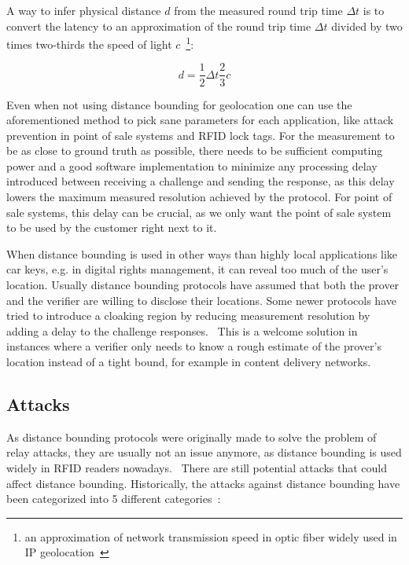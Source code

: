 A way to infer physical distance \(d\) from the measured round trip time \(\Delta t\) is to convert the latency to an approximation of the round trip time \(\Delta t\) divided by two times two-thirds the speed of light \(c\)~\footnote{an approximation of network transmission speed in optic fiber widely used in IP geolocation~\cite{Candela2020-am}}:

\begin{equation*}
  d = \frac{1}{2}\Delta t \frac{2}{3}c
\end{equation*}

Even when not using distance bounding for geolocation one can use the aforementioned method to pick sane parameters for each application, like attack prevention in point of sale systems and RFID lock tags. For the measurement to be as close to ground truth as possible, there needs to be sufficient computing power and a good software implementation to minimize any processing delay introduced between receiving a challenge and sending the response, as this delay lowers the maximum measured resolution achieved by the protocol. For point of sale systems, this delay can be crucial, as we only want the point of sale system to be used by the customer right next to it.

When distance bounding is used in other ways than highly local applications like car keys, e.g. in digital rights management, it can reveal too much of the user's location. Usually distance bounding protocols have assumed that both the prover and the verifier are willing to disclose their locations. Some newer protocols have tried to introduce a cloaking region by reducing measurement resolution by adding a delay to the challenge responses.~\cite{Molina-Martinez2018-nw} This is a welcome solution in instances where a verifier only needs to know a rough estimate of the prover's location instead of a tight bound, for example in content delivery networks.

\subsection{Attacks}
As distance bounding protocols were originally made to solve the problem of relay attacks, they are usually not an issue anymore, as distance bounding is used widely in RFID readers nowadays.~\cite{Nikov_undated-vv} There are still potential attacks that could affect distance bounding. Historically, the attacks against distance bounding have been categorized into 5 different categories~\cite{Boureanu_undated-bn}:

